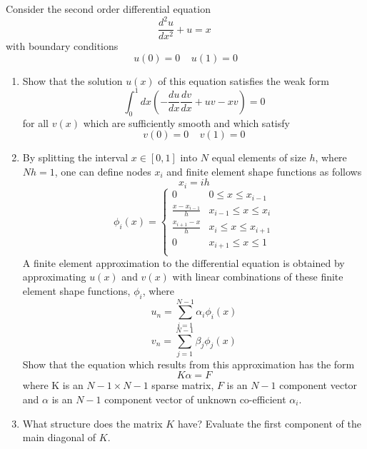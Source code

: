 \documentclass[a4paper,12pt]{article}
\theoremstyle{Qstyle}
\begin{document}
\begin{enumerate}
\begin{question}{33}
	Consider the second order differential equation 
	\[\frac{d^2u}{dx^2}+u=x \ \]
	with boundary conditions
	\[u(0)=0 \ \ \ \ \ u(1)=0 \]
	\begin{enumerate}
		\item
		Show that the solution $u(x)$ of this equation satisfies the weak form
		\[ \int_{0}^{1} dx \left(-\frac{du}{dx}\frac{dv}{dx}+uv-xv \right) = 0\]
		for all $v(x)$ which are sufficiently smooth and which satisfy
		\[v(0)=0 \ \ \ \ \ v(1)=0 \]
		\item
		By splitting the interval $x\in [0,1]$ into $N$ equal elements of size $h$, where
		$Nh=1$, one can define nodes $x_i$ and finite element shape functions as 
		follows
		\[x_i=ih \]
		\[\phi_i(x)=\left\{\begin{array}{ll} 
		0 & 0\leq x \leq x_{i-1}\\
		\frac{x-x_{i-1}}{h} & x_{i-1}\leq x \leq x_{i}\\
		\frac{x_{i+1}-x}{h} & x_{i}\leq x \leq x_{i+1}\\
		0 & x_{i+1}\leq x \leq 1\\
		\end{array} \right. \]
		A finite element approximation to the differential equation is obtained by approximating $u(x)$ and $v(x)$ with linear combinations of these finite element shape
		functions, $\phi_i$, where
		\[ u_{n} = \sum_{i=1}^{N-1}\alpha_i \phi_i(x) \]
		\[ v_{n} = \sum_{j=1}^{N-1}\beta_j \phi_j(x) \]
		Show that the equation which results from this approximation has the form
		\[K\alpha= F \]
		where K is an $N-1 \times N-1$ sparse matrix, $F$ is an $N-1$ component vector
		and $\alpha$ is an $N-1$ component vector of unknown co-efficient $\alpha_i$.
		\item
		What structure does the matrix $K$ have?
		Evaluate the first component of the main diagonal of $K$.
\end{enumerate}
	
\end{question}


\end{enumerate}
\end{document}
